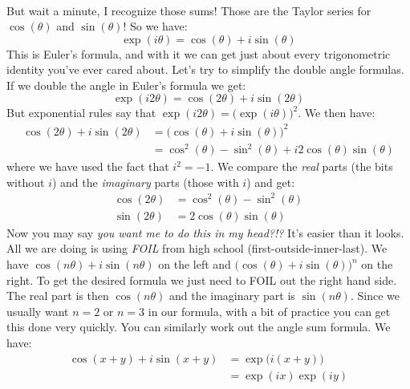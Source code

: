 \documentclass{article}
\theoremstyle{normal}
\newenvironment{example}{%
    \pushQED{\qed}\renewcommand{\qedsymbol}{$\blacksquare$}\examplex%
}{%
    \popQED\endexamplex%
}
\begin{document}
\begin{example}[\textbf{Euler's Formula}]
\begin{align}
        \end{align}
        But wait a minute, I recognize those sums! Those are the Taylor series
        for $\cos(\theta)$ and $\sin(\theta)$! So we have:
        \begin{equation}
            \exp(i\theta)=\cos(\theta)+i\sin(\theta)
        \end{equation}
        This is Euler's formula, and with it we can get just about every
        trigonometric identity you've ever cared about. Let's try to simplify
        the double angle formulas. If we double the angle in Euler's formula
        we get:
        \begin{equation}
            \exp(i2\theta)=\cos(2\theta)+i\sin(2\theta)
        \end{equation}
        But exponential rules say that
        $\exp(i2\theta)=\big(\exp(i\theta)\big)^{2}$. We then have:
        \begin{align}
            \cos(2\theta)+i\sin(2\theta)
            &=\Big(\cos(\theta)+i\sin(\theta)\Big)^{2}\\
            &=\cos^{2}(\theta)-\sin^{2}(\theta)+i2\cos(\theta)\sin(\theta)
        \end{align}
        where we have used the fact that $i^{2}=-1$. We compare the
        \textit{real} parts (the bits without $i$) and the
        \textit{imaginary} parts (those with $i$) and get:
        \begin{align}
            \cos(2\theta)&=\cos^{2}(\theta)-\sin^{2}(\theta)\\
            \sin(2\theta)&=2\cos(\theta)\sin(\theta)
        \end{align}
        Now you may say \textit{you want me to do this in my head?!?} It's
        easier than it looks. All we are doing is using \textit{FOIL} from
        high school (first-outside-inner-last). We have
        $\cos(n\theta)+i\sin(n\theta)$ on the left and
        $\big(\cos(\theta)+i\sin(\theta)\big)^{n}$ on the right. To get the
        desired formula we just need to FOIL out the right hand side.
        The real part is then $\cos(n\theta)$ and the imaginary part is
        $\sin(n\theta)$. Since we usually want $n=2$ or $n=3$ in our formula,
        with a bit of practice you can get this done very quickly. You can
        similarly work out the angle sum formula. We have:
        \begin{align}
            \cos(x+y)+i\sin(x+y)
            &=\exp\big(i(x+y)\big)\\
            &=\exp(ix)\exp(iy)\\

\end{align}
\end{example}
\end{document}
